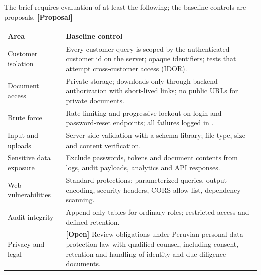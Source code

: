 \documentclass[11pt,a4paper]{article}
\newcommand{\code}[1]{\texttt{\detokenize{#1}}}
\newcommand{\tagprop}{\textcolor{orange!80!black}{\textbf{[Proposal]}}}
\newcommand{\tagopen}{\textcolor{red!70!black}{\textbf{[Open]}}}
\begin{document}
The brief requires evaluation of at least the following; the baseline controls are proposals. \tagprop{}

\begin{longtable}{@{}L{4.2cm}L{11.6cm}@{}}
	\toprule
	\textbf{Area}           & \textbf{Baseline control}                                                                                                                                                            \\
	\midrule
	\endhead
	Customer isolation      & Every customer query is scoped by the authenticated customer id on the server; opaque identifiers; tests that attempt cross-customer access (IDOR).                                  \\
	Document access         & Private storage; downloads only through backend authorization with short-lived links; no public URLs for private documents.                                                          \\
	Brute force             & Rate limiting and progressive lockout on login and password-reset endpoints; all failures logged in \code{AccessLogs}.                                                               \\
	Input and uploads       & Server-side validation with a schema library; file type, size and content verification.                                                                                              \\
	Sensitive data exposure & Exclude passwords, tokens and document contents from logs, audit payloads, analytics and API responses.                                                                              \\
	Web vulnerabilities     & Standard protections: parameterized queries, output encoding, security headers, CORS allow-list, dependency scanning.                                                                \\
	Audit integrity         & Append-only tables for ordinary roles; restricted access and
	defined retention.                                                                                                                                                                                             \\
	Privacy and legal       & \tagopen{} Review obligations under Peruvian personal-data protection law with qualified counsel, including consent, retention and handling of identity and due-diligence documents. \\
	\bottomrule
\end{longtable}
\end{document}
